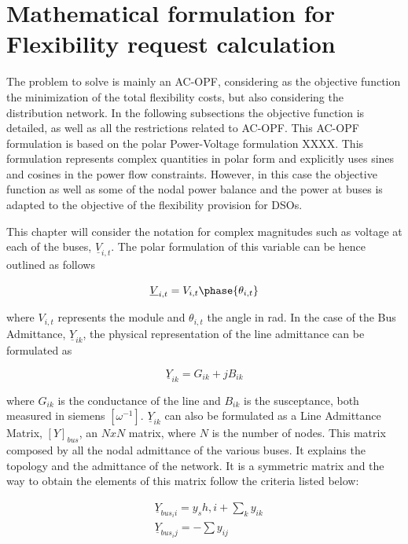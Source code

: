 \section{Mathematical formulation for Flexibility request calculation}
The problem to solve is mainly an AC-OPF, considering as the objective function the minimization of the total flexibility costs, but also considering the distribution network. In the following subsections the objective function is detailed, as well as all the restrictions related to AC-OPF. 
This AC-OPF formulation is based  on the polar Power-Voltage formulation XXXX. This formulation represents complex quantities in polar form and explicitly uses sines and cosines in the power flow constraints. However, in this case the objective function as well as some of the nodal power balance and the power at buses is adapted to the objective of the flexibility provision for DSOs.

This chapter will consider the notation for complex magnitudes such as voltage at each of the buses, $\underline{V}_{i,t}$. The polar formulation of this variable can be hence outlined as follows

\begin{equation}
\underline{V}_{i,t} = V_{i,t} \phase{\theta_{i,t}}
\end{equation}

where $V_{i,t}$ represents the module and $\theta_{i,t}$ the angle in rad. In the case of the Bus Admittance, $\underline{Y}_{ik}$, the physical representation of the line admittance can be formulated as

\begin{equation}
\underline{Y}_{ik} = G_{ik} + jB_{ik}
\end{equation}

where $G_{ik}$ is the conductance of the line and $B_{ik}$ is the susceptance, both measured in siemens $[\omega^{-1}]$. $\underline{Y}_{ik}$ can also be formulated as a Line Admittance Matrix, $[Y]_{bus}$, an $N x N$ matrix, where $N$ is the number of nodes. This matrix composed by all the nodal admittance of the various buses. It explains the topology and the admittance of the network. It is a symmetric matrix and the way to obtain the elements of this matrix follow the criteria listed below:

\begin{subequations}
\begin{align*}
& \underline{Y}_{bus_ii}= y_sh,i + \sum_k y_{ik} \\
& \underline{Y}_{bus_ij} = - \sum y_{ij}
\end{align*}
\end{subequations}

